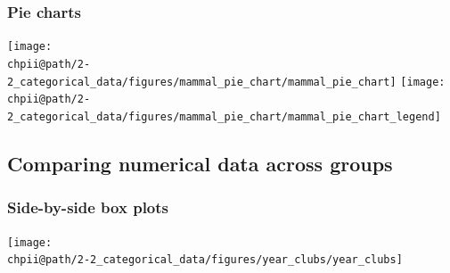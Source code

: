 \documentclass[slidestop,compress,mathserif]{beamer}
\makeatletter
\def\chpii@path{../../Chp 2}
\makeatother
\begin{document}
\begin{frame}
\frametitle{Pie charts}


\vspace{-0.5cm}

\begin{center}
\texttt{[image: \\chpii@path/2-2\_categorical\_data/figures/mammal\_pie\_chart/mammal\_pie\_chart]}
\texttt{[image: \\chpii@path/2-2\_categorical\_data/figures/mammal\_pie\_chart/mammal\_pie\_chart\_legend]}
\end{center}


\end{frame}



\subsection{Comparing numerical data across groups}


\begin{frame}
\frametitle{Side-by-side box plots}


\begin{center}
\texttt{[image: \\chpii@path/2-2\_categorical\_data/figures/year\_clubs/year\_clubs]}
\end{center}

\end{frame}




\end{document}
